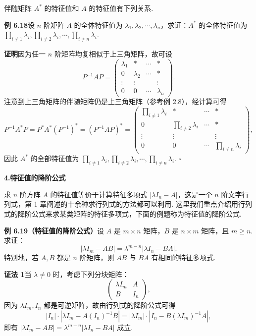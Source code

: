 \documentclass[UTF8, 12pt, fontset=fandol, oneside]{ctexart}
\begin{document}
伴随矩阵 $A^*$ 的特征值和 $A$ 的特征值有下列关系.

\noindent\textbf{例 6.18}\quad 设 $n$ 阶矩阵 $A$ 的全体特征值为 $\lambda_1,\lambda_2,\cdots,\lambda_n$，求证：$A^*$ 的全体特征值为 $\prod_{i\ne 1}\lambda_i,\prod_{i\ne 2}\lambda_i,\cdots,\prod_{i\ne n}\lambda_i$.

\noindent\textbf{证明}\quad 因为任一 $n$ 阶矩阵均复相似于上三角矩阵，故可设
\[
P^{-1}AP=\left(\begin{array}{cccc}
\lambda_1 & * & \cdots & *\\
0 & \lambda_2 & \cdots & *\\
\vdots & \vdots & & \vdots\\
0 & 0 & \cdots & \lambda_n
\end{array}\right).
\]
注意到上三角矩阵的伴随矩阵仍是上三角矩阵（参考例 2.8），经计算可得
\[
P^{-1}A^*P=P^*A^*(P^{-1})^*=(P^{-1}AP)^*
=\left(\begin{array}{cccc}
\prod_{i\ne 1}\lambda_i & * & \cdots & *\\
0 & \prod_{i\ne 2}\lambda_i & \cdots & *\\
\vdots & \vdots & & \vdots\\
0 & 0 & \cdots & \prod_{i\ne n}\lambda_i
\end{array}\right),
\]
因此 $A^*$ 的全部特征值为 $\prod_{i\ne 1}\lambda_i,\prod_{i\ne 2}\lambda_i,\cdots,\prod_{i\ne n}\lambda_i$. $\square$

\noindent\textbf{4.\quad 特征值的降阶公式}

求 $n$ 阶方阵 $A$ 的特征值等价于计算特征多项式 $|\lambda I_n-A|$，这是一个 $n$ 阶文字行列式，第 1 章阐述的十余种求行列式的方法都可以利用. 这里我们重点介绍用行列式的降阶公式来求某类矩阵的特征多项式，下面的例题称为特征值的降阶公式.

\noindent\textbf{例 6.19（特征值的降阶公式）}\quad 设 $A$ 是 $m\times n$ 矩阵，$B$ 是 $n\times m$ 矩阵，且 $m\ge n$. 求证：
\[
|\lambda I_m-AB|=\lambda^{m-n}|\lambda I_n-BA|.
\]
特别地，若 $A,B$ 都是 $n$ 阶矩阵，则 $AB$ 与 $BA$ 有相同的特征多项式.

\noindent\textbf{证法 1}\quad 当 $\lambda\ne 0$ 时，考虑下列分块矩阵：
\[
\left(\begin{array}{cc}
\lambda I_m & A\\
B & I_n
\end{array}\right),
\]
因为 $\lambda I_m,I_n$ 都是可逆矩阵，故由行列式的降阶公式可得
\[
|I_n|\cdot|\lambda I_m-A(I_n)^{-1}B|
=|\lambda I_m|\cdot|I_n-B(\lambda I_m)^{-1}A|,
\]
即有 $|\lambda I_m-AB|=\lambda^{m-n}|\lambda I_n-BA|$ 成立.
\end{document}
